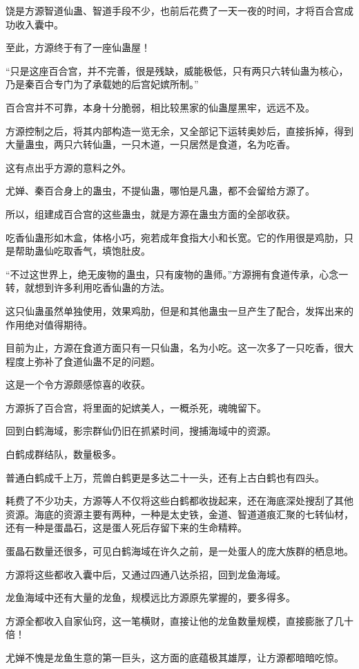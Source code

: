\begin{this_body}
饶是方源智道仙蛊、智道手段不少，也前后花费了一天一夜的时间，才将百合宫成功收入囊中。

至此，方源终于有了一座仙蛊屋！

“只是这座百合宫，并不完善，很是残缺，威能极低，只有两只六转仙蛊为核心，乃是秦百合专门为了承载她的后宫妃嫔所制。”

百合宫并不可靠，本身十分脆弱，相比较黑家的仙蛊屋黑牢，远远不及。

方源控制之后，将其内部构造一览无余，又全部记下运转奥妙后，直接拆掉，得到大量蛊虫，两只六转仙蛊，一只木道，一只居然是食道，名为吃香。

这有点出乎方源的意料之外。

尤婵、秦百合身上的蛊虫，不提仙蛊，哪怕是凡蛊，都不会留给方源了。

所以，组建成百合宫的这些蛊虫，就是方源在蛊虫方面的全部收获。

吃香仙蛊形如木盒，体格小巧，宛若成年食指大小和长宽。它的作用很是鸡肋，只是帮助蛊仙吃取香气，填饱肚皮。

“不过这世界上，绝无废物的蛊虫，只有废物的蛊师。”方源拥有食道传承，心念一转，就想到许多利用吃香仙蛊的方法。

这只仙蛊虽然单独使用，效果鸡肋，但是和其他蛊虫一旦产生了配合，发挥出来的作用绝对值得期待。

目前为止，方源在食道方面只有一只仙蛊，名为小吃。这一次多了一只吃香，很大程度上弥补了食道仙蛊不足的问题。

这是一个令方源颇感惊喜的收获。

方源拆了百合宫，将里面的妃嫔美人，一概杀死，魂魄留下。

回到白鹤海域，影宗群仙仍旧在抓紧时间，搜捕海域中的资源。

白鹤成群结队，数量极多。

普通白鹤成千上万，荒兽白鹤更是多达二十一头，还有上古白鹤也有四头。

耗费了不少功夫，方源等人不仅将这些白鹤都收拢起来，还在海底深处搜刮了其他资源。海底的资源主要有两种，一种是太史铁，金道、智道道痕汇聚的七转仙材，还有一种是蛋晶石，这是蛋人死后存留下来的生命精粹。

蛋晶石数量还很多，可见白鹤海域在许久之前，是一处蛋人的庞大族群的栖息地。

方源将这些都收入囊中后，又通过四通八达杀招，回到龙鱼海域。

龙鱼海域中还有大量的龙鱼，规模远比方源原先掌握的，要多得多。

方源全都收入自家仙窍，这一笔横财，直接让他的龙鱼数量规模，直接膨胀了几十倍！

尤婵不愧是龙鱼生意的第一巨头，这方面的底蕴极其雄厚，让方源都暗暗吃惊。


\end{this_body}
